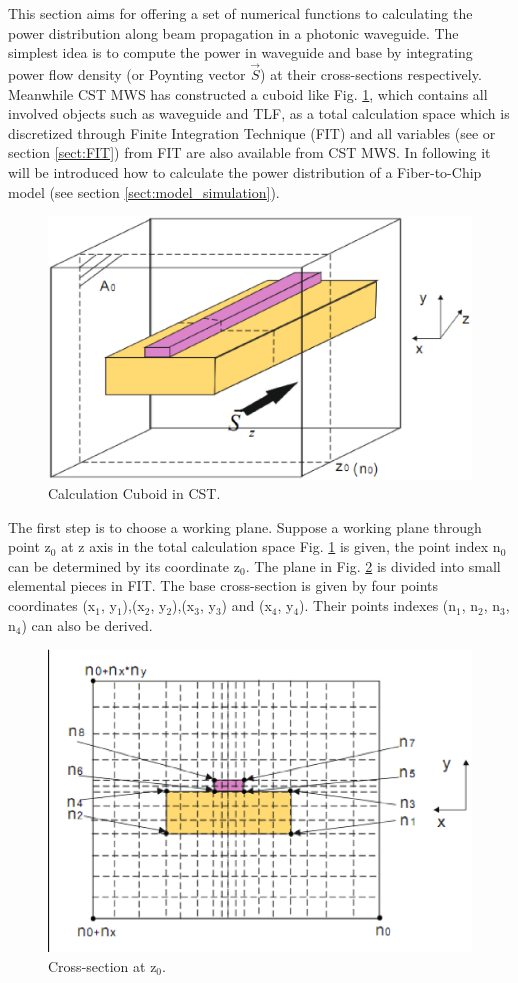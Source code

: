 
This section aims for offering a set of numerical functions to calculating the power distribution along beam propagation in a photonic waveguide. The simplest idea is to compute the power in waveguide and base by integrating power flow density (or Poynting vector $\vec{S}$) at their cross-sections respectively. Meanwhile CST MWS has constructed a cuboid like Fig. \ref{Afig:app_power_distribution01}, which contains all involved objects such as waveguide and TLF, as a total calculation space which is discretized through Finite Integration Technique (FIT) and all variables (see \cite{script_FeldSim} or section \ref{sect:FIT}) from FIT are also available from CST MWS. In following it will be introduced how to calculate the power distribution of a Fiber-to-Chip model (see section \ref{sect:model_simulation}). 
\begin{figure}[ht]
\centering
\includegraphics[width=0.7 \textwidth]{bilder/app_power_distribution01}
\caption{Calculation Cuboid in CST.}
\label{Afig:app_power_distribution01}
\end{figure}
The first step is to choose a working plane. Suppose a working plane through point z$_{0}$ at z axis in the total calculation space Fig. \ref{Afig:app_power_distribution01} is given, the point index n$_{0}$ can be determined by its coordinate z$_{0}$. The plane in Fig. \ref{Afig:app_power_distribution02} is divided into small elemental pieces in FIT. The base cross-section is given by four points coordinates (x$_{1}$, y$_{1}$),(x$_{2}$, y$_{2}$),(x$_{3}$, y$_{3}$) and (x$_{4}$, y$_{4}$). Their points indexes (n$_{1}$, n$_{2}$, n$_{3}$, n$_{4}$) can also be derived.    
\begin{figure}[ht]
\centering
\includegraphics[width=0.7 \textwidth]{bilder/app_power_distribution02}
\caption{Cross-section at z$_{0}$.}
\label{Afig:app_power_distribution02}
\end{figure}

